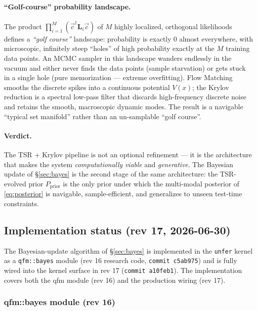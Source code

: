 \documentclass[11pt, a4paper]{article}
\begin{document}
\paragraph{``Golf-course'' probability landscape.} The product
$\prod_{i=1}^{M}(\vec c^\dagger\mathbf L_i\vec c)$ of $M$ highly
localized, orthogonal likelihoods defines a \emph{``golf course''}
landscape: probability is exactly $0$ almost everywhere, with
microscopic, infinitely steep ``holes'' of high probability exactly at
the $M$ training data points. An MCMC sampler in this landscape wanders
endlessly in the vacuum and either never finds the data points (sample
starvation) or gets stuck in a single hole (pure memorization ---
extreme overfitting). Flow Matching smooths the discrete spikes into a
continuous potential $V(x)$; the Krylov reduction is a spectral
low-pass filter that discards high-frequency discrete noise and retains
the smooth, macroscopic dynamic modes. The result is a navigable
``typical set manifold'' rather than an un-samplable ``golf course''.

\paragraph{Verdict.} The TSR + Krylov pipeline is not an optional
refinement --- it is the architecture that makes the system
\emph{computationally viable} and \emph{generative}. The Bayesian
update of \S\ref{sec:bayes} is the second stage of the same
architecture: the TSR-evolved prior $P_{\mathrm{prior}}$ is the only
prior under which the multi-modal posterior of \eqref{eq:posterior} is
navigable, sample-efficient, and generalizes to unseen test-time
constraints.

\subsection{Implementation status (rev 17, 2026-06-30)}

The Bayesian-update algorithm of \S\ref{sec:bayes} is implemented
in the \texttt{unfer} kernel as a \texttt{qfm::bayes} module
(rev 16 research code, \texttt{commit c5ab975}) and is fully wired
into the kernel surface in rev 17 (\texttt{commit a10feb1}). The
implementation covers both the qfm module (rev 16) and the
production wiring (rev 17).

\subsubsection*{qfm::bayes module (rev 16)}
\end{document}
